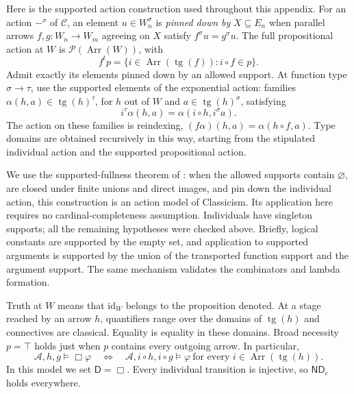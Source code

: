 \documentclass[11pt]{article}
\theoremstyle{definition}
\newcommand{\D}{\mathsf D}
\newcommand{\Arr}{\operatorname{Arr}}
\newcommand{\tg}{\operatorname{tg}}
\newcommand{\id}{\mathrm{id}}
\newcommand{\ND}{\mathsf{ND}_e}
\numberwithin{equation}{section}
\begin{document}
Here is the supported action construction used throughout this appendix. For an action $-^\sigma$ of $\mathcal C$, an element $u\in W_n^\sigma$ is \emph{pinned down by} $X\subseteq E_n$ when parallel arrows $f,g:W_n\to W_m$ agreeing on $X$ satisfy $f^\sigma u=g^\sigma u$. The full propositional action at $W$ is $\mathcal P(\Arr(W))$, with
\begin{equation}\label{eq:paction}
f^t p=\{i\in\Arr(\tg(f)):i\circ f\in p\}.
\end{equation}
Admit exactly its elements pinned down by an allowed support. At function type $\sigma\to\tau$, use the supported elements of the exponential action: families $\alpha(h,a)\in\tg(h)^\tau$, for $h$ out of $W$ and $a\in\tg(h)^\sigma$, satisfying
\begin{equation}\label{eq:naturality}
i^\tau\alpha(h,a)=\alpha(i\circ h,i^\sigma a).
\end{equation}
The action on these families is reindexing, $(f\alpha)(h,a)=\alpha(h\circ f,a)$. Type domains are obtained recursively in this way, starting from the stipulated individual action and the supported propositional action.

We use the supported-fullness theorem of \citet[Appendix~D, Proposition~D.5]{BD}: when the allowed supports contain $\varnothing$, are closed under finite unions and direct images, and pin down the individual action, this construction is an action model of Classicism. Its application here requires no cardinal-completeness assumption. Individuals have singleton supports; all the remaining hypotheses were checked above. Briefly, logical constants are supported by the empty set, and application to supported arguments is supported by the union of the transported function support and the argument support. The same mechanism validates the combinators and lambda formation.

Truth at $W$ means that $\id_W$ belongs to the proposition denoted. At a stage reached by an arrow $h$, quantifiers range over the domains of $\tg(h)$ and connectives are classical. Equality is equality in these domains. Broad necessity $p=\top$ holds just when $p$ contains every outgoing arrow. In particular,
\begin{equation}\label{eq:modaltruth}
\mathcal A,h,g\models\Box\varphi
\quad\Longleftrightarrow\quad
\mathcal A,i\circ h,i\circ g\models\varphi
\ \text{for every }i\in\Arr(\tg(h)).
\end{equation}
In this model we set $\D =\Box$. Every individual transition is injective, so $\ND$ holds everywhere.
\end{document}
